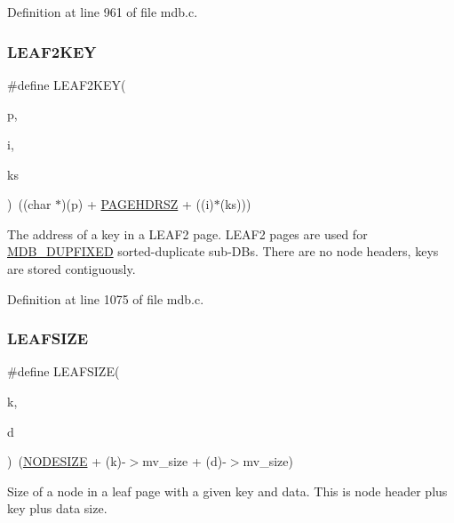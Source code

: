 Definition at line 961 of file mdb.\+c.

\mbox{\label{group__internal_ga7c01a3e255fb83aab9136fc9a840858a}} 
\subsubsection{\texorpdfstring{L\+E\+A\+F2\+K\+EY}{LEAF2KEY}}
{\footnotesize\ttfamily \#define L\+E\+A\+F2\+K\+EY(\begin{DoxyParamCaption}\item[{}]{p,  }\item[{}]{i,  }\item[{}]{ks }\end{DoxyParamCaption})~((char $\ast$)(p) + \mbox{\hyperlink{group__internal_gae25bcf0c0c5c5ead27e82543cbce02e1}{P\+A\+G\+E\+H\+D\+R\+SZ}} + ((i)$\ast$(ks)))}

The address of a key in a L\+E\+A\+F2 page. L\+E\+A\+F2 pages are used for \mbox{\hyperlink{group__mdb__dbi__open_ga5acc26f80668d1ebc31265d178c69338}{M\+D\+B\+\_\+\+D\+U\+P\+F\+I\+X\+ED}} sorted-\/duplicate sub-\/\+D\+Bs. There are no node headers, keys are stored contiguously. 

Definition at line 1075 of file mdb.\+c.

\mbox{\label{group__internal_gacf0931b7f08df74abb803b41692ef965}} 
\subsubsection{\texorpdfstring{L\+E\+A\+F\+S\+I\+ZE}{LEAFSIZE}}
{\footnotesize\ttfamily \#define L\+E\+A\+F\+S\+I\+ZE(\begin{DoxyParamCaption}\item[{}]{k,  }\item[{}]{d }\end{DoxyParamCaption})~(\mbox{\hyperlink{group__internal_ga7d24748fedf732c90d840cbf0714d8d8}{N\+O\+D\+E\+S\+I\+ZE}} + (k)-\/$>$mv\+\_\+size + (d)-\/$>$mv\+\_\+size)}

Size of a node in a leaf page with a given key and data. This is node header plus key plus data size. 

